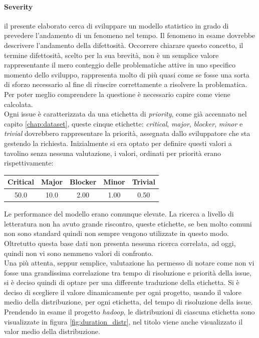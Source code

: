 \documentclass[%
    corpo=12pt,
    twoside,
    oldstyle,
    autoretitolo,
    greek,
    evenboxes,
]{toptesi}
\begin{document}
\paragraph{Severity} il presente elaborato cerca di sviluppare un modello statistico in grado di prevedere l'andamento di un fenomeno nel tempo. Il fenomeno in esame dovrebbe descrivere l'andamento della difettosità. Occorrere chiarare questo concetto, il termine difettosità, scelto per la sua brevità, non è un semplice valore rappresentante il mero conteggio delle problematiche attive in uno specifico momento dello sviluppo, rappresenta molto di più quasi come se fosse una sorta di sforzo necessario al fine di riuscire correttamente a risolvere la problematica. Per poter meglio comprendere la questione è necessario capire come viene calcolata.\\
Ogni issue è caratterizzata da una etichetta di \textit{priority}, come già accennato nel capito \ref{chap:dataset}, queste cinque etichette: \textit{critical}, \textit{major}, \textit{blocker}, \textit{minor} e \textit{trivial} dovrebbero rappresentare la priorità, assegnata dallo sviluppatore che sta gestendo la richiesta. Inizialmente si era optato per definire questi valori a tavolino senza nessuna valutazione, i valori, ordinati per priorità erano rispettivamente:
\begin{center}
   \label{tab:priority}
  \begin{tabular}{ |c|c|c|c|c| }
     \hline
     \textbf{Critical} & \textbf{Major} & \textbf{Blocker} & \textbf{Minor} & \textbf{Trivial} \\
     \hline
     \hline
     50.0 & 10.0 & 2.00 & 1.00 & 0.50 \\
     \hline
  \end{tabular}
\end{center}
Le performance del modello erano comunque elevate. La ricerca a livello di letteratura non ha avuto grande riscontro, queste etichette, se ben molto comuni non sono standard quindi non sempre vengono utilizzate in questo modo. Oltretutto questa base dati non presenta nessuna ricerca correlata, ad oggi, quindi non vi sono nemmeno valori di confronto.\\
Una più attenta, seppur semplice, valutazione ha permesso di notare come non vi fosse una grandissima correlazione tra tempo di risoluzione e priorità della issue, si è deciso quindi di optare per una differente traduzione della etichetta. Si è deciso di scegliere il valore dinamicamente per ogni progetto, usando il valore medio della distribuzione, per ogni etichetta, del tempo di risoluzione della issue. Prendendo in esame il progetto \textit{hadoop}, le distribuzioni di ciascuna etichetta sono visualizzate in figura \ref{fig:duration_distr}, nel titolo viene anche visualizzato il valor medio della distribuzione.
\end{document}
